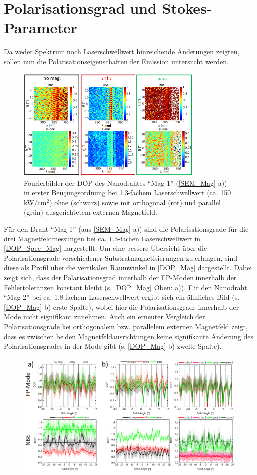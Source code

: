 \section{Polarisationsgrad und Stokes-Parameter}
Da weder Spektrum noch Laserschwellwert hinreichende Änderungen zeigten, sollen nun die Polarisationseigenschaften der Emission untersucht werden.\begin{figure}[b]
\centering
\includegraphics[width=0.8\textwidth]{Bilder/Mag/DOP_Spec_Mag}
\caption{Fourierbilder der DOP des Nanodrahtes ``Mag 1'' (\autoref{SEM_Mag} a)) in erster Beugungsordnung bei 1.3-fachem Laserschwellwert (ca. 150 kW/cm$^\text{2}$) ohne (schwarz) sowie mit orthogonal (rot) und parallel (grün) ausgerichtetem externen Magnetfeld.}
\label{DOP_Spec_Mag}
\end{figure} Für den Draht ``Mag 1'' (aus \autoref{SEM_Mag} a)) sind die Polarisationsgrade für die drei Magnetfeldmessungen bei ca. 1.3-fachen Laserschwellwert in \autoref{DOP_Spec_Mag} dargestellt. Um eine bessere Übersicht über die Polarisationsgrade verschiedener Substratmagnetisierungen zu erlangen, sind diese als Profil über die vertikalen Raumwinkel in \autoref{DOP_Mag} dargestellt. Dabei zeigt sich, dass der Polarisationsgrad innerhalb der FP-Moden innerhalb der Fehlertoleranzen konstant bleibt (s. \autoref{DOP_Mag} Oben: a)). Für den Nanodraht ``Mag 2'' bei ca. 1.8-fachem Laserschwellwert ergibt sich ein ähnliches Bild (s. \autoref{DOP_Mag} b) erste Spalte), wobei hier die Polarisationsgrade innerhalb der Mode nicht signifikant zunehmen. Auch ein erneuter Vergleich der Polarisationsgrade bei orthogonalem bzw. parallelem externen Magnetfeld zeigt, dass es zwischen beiden Magnetfeldausrichtungen keine signifikante Änderung des Polarisationsgrades in der Mode gibt (s. \autoref{DOP_Mag} b) zweite Spalte).\\\begin{figure}[b]
\centering
\includegraphics[width=1\textwidth]{Bilder/Mag/DOP_Mag}

\end{figure}

